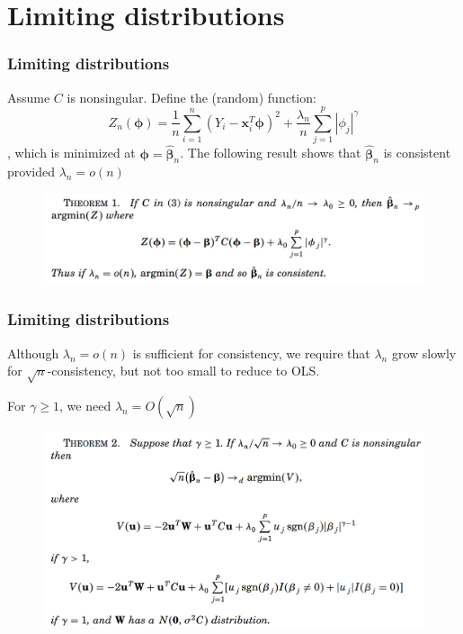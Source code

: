 \documentclass{beamer}
\begin{document}
	\section{Limiting distributions}
	
	\begin{frame}
		\frametitle{Limiting distributions}
		Assume $C$ is nonsingular. Define the (random) function:
		$$Z_n(\bm{\phi}) = \frac{1}{n}\sum_{i=1}^{n}(Y_i-\bm{x}_i^T\bm{\phi})^2 + \frac{\lambda_n}{n}\sum_{j=1}^{p}|\phi_j|^{\gamma}$$
		, which is minimized at $\bm{\phi} = \hat{\bm{\beta}}_n$. The following result shows that $\hat{\bm{\beta}}_n$ is consistent provided $\lambda_n = o(n)$
		\begin{figure}
			\includegraphics[width=1\linewidth]{image001.png}
		\end{figure}
	\end{frame}
	
	\begin{frame}
		\frametitle{Limiting distributions}
		Although $\lambda_n = o(n)$ is sufficient for consistency, we require that $\lambda_n$ grow slowly for $\sqrt{n}$-consistency, but not too small to reduce to OLS.
		
		For $\gamma \geq 1$, we need $\lambda_n = O(\sqrt{n})$
		\begin{figure}
			\includegraphics[width=1\linewidth]{image002.png}
		\end{figure}
	\end{frame}
	
\end{document}
